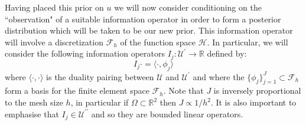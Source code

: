 Having placed this prior on $u$ we will now consider conditioning on the ``observation" of a suitable information operator in order to form a posterior distribution which will be taken to be our new prior. This information operator will involve a discretization $\mathcal{F}_{h}$ of the function space $\mathcal{H}$. In particular, we will consider the following information operators $I_{j}:\mathcal{U}^{\prime}\rightarrow\mathbb{R}$ defined by:
\begin{equation*}
    I_{j}\boldsymbol{\cdot} = \langle\boldsymbol{\cdot},\phi_{j}\rangle
\end{equation*}
where $\langle\boldsymbol{\cdot},\boldsymbol{\cdot}\rangle$ is the duality pairing between $\mathcal{U}$ and $\mathcal{U}^{\prime}$ and where the $\{\phi_{j}\}_{j=1}^{J}\subset\mathcal{F}_{h}$ form a basis for the finite element space $\mathcal{F}_{h}$. Note that $J$ is inversely proportional to the mesh size $h$, in particular if $\Omega\subset\mathbb{R}^{2}$ then $J\propto 1/h^2$. It is also important to emphasise that $I_{j}\in\mathcal{U}^{\prime\prime}$ and so they are bounded linear operators.

